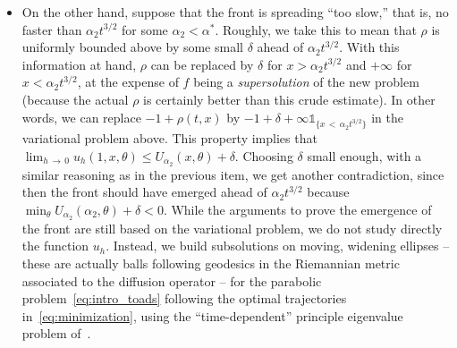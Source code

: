 \documentclass[AHL,Unicode,longabstracts]{cedram}
\newcommand{\1}{\mathds{1}}
\begin{document}
\begin{itemize}
\item On the other hand, suppose that the front is spreading ``too slow,'' that is, no faster than $\alpha_2 t^{3/2}$ for some $\alpha_2<\alpha^*$. Roughly, we take this to mean that $\rho$ is uniformly bounded above by some small $\delta$ ahead of $\alpha_2 t^{3/2}$. With this information at hand, $\rho$ can be replaced by $\delta $ for $x > \alpha_2 t^{3/2}$ and $+\infty$ for $x < \alpha_2 t^{3/2}$, at the expense of $f$ being a \emph{supersolution} of the new problem (because the actual $\rho$ is certainly better than this crude estimate). In other words, we can replace $-1+\rho(t,x)$ by $-1+\delta+\infty \1_{\{ x\,<\,\alpha_2 t^{3/2}\}}$ in the variational problem above. This property implies that $\lim_{h\,\to\,0} u_h(1,x,\theta) \leq U_{\alpha_2}(x,\theta)+\delta$. Choosing $\delta$ small enough, with a similar reasoning as in the previous item, we get another contradiction, since then the front should have emerged ahead of $\alpha_2 t^{3/2}$ because $\min_\theta U_{\alpha_2}(\alpha_2,\theta) +\delta<0$. While the arguments to prove the emergence of the front are still based on the variational problem, we do not study directly the function $u_h$. Instead, we build subsolutions on moving, widening ellipses -- these are actually balls following geodesics in the Riemannian metric associated to the diffusion operator -- for the parabolic problem~\eqref{eq:intro_toads} following the optimal trajectories in~\eqref{eq:minimization}, using the ``time-dependent'' principle eigenvalue problem of~\cite{BHR_acceleration}.
\end{itemize}
\end{document}
